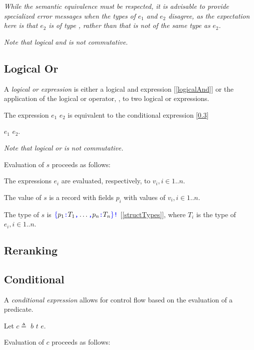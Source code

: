 \documentclass{article}
\begin{document}
{{\em While the semantic equivalence must be respected, it is advisable to provide specialized error messages when the types of $e_1$ and $e_2$ disagree,  as the expectation here is that $e_2$ is of type \BOOL{}, rather than that \FALSE{} is not of the same type as $e_2$.
}

{\em
Note that logical and is not commutative.
}

\subsection{Logical Or}
\label{logicalOr}

A {\em logical or expression} is either a logical and expression [\ref{logicalAnd}] or the application of the logical or operator, \AND{}, to two logical or expressions.

\OrExpression{}

The expression $e_1$ \OR{} $e_2$ is equivalent to the conditional expression [\ref{conditional}] 

\IF{} $e_1$ \THEN{} \TRUE{} \ELSE{} $e_2$.

{\em
Note that logical or is not commutative.
}


Evaluation of $s$ proceeds as follows:

The expressions $e_i$ are evaluated, respectively, to $v_i, i \in 1..n$. 

The value of $s$ is a record with fields $p_i$ with values of $v_i, i \in 1..n$. 

The type of $s$ is $\texttt{\color{blue} $\{$}{}p_1\texttt{\color{blue} :}{} T_1\texttt{\color{blue} ,}{} \ldots\texttt{\color{blue} ,}{} p_n\texttt{\color{blue} :}{} T_n\texttt{\color{blue} $\}$}\texttt{\color{blue} !}$ [\ref{structTypes}], where $T_i$ is the type of $e_i, i \in 1..n$.


\subsection{Reranking}
\label{reranking}


\subsection{Conditional}
\label{conditional}

A {\em conditional expression} allows for control flow based on the evaluation of a predicate.

\ConditionalExpression{}

Let $c \triangleq $ \IF{} $b$ \THEN{} $t$ \ELSE{} $e$.

Evaluation of $c$ proceeds as follows:

}
\end{document}
